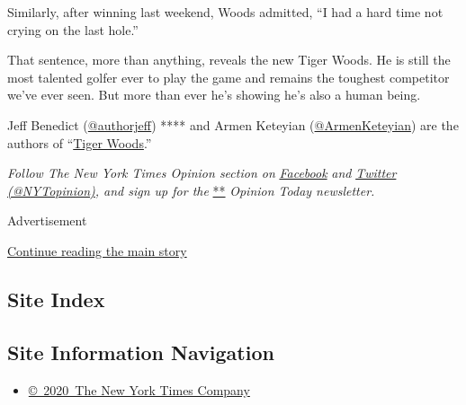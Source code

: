 Similarly, after winning last weekend, Woods admitted, ``I had a hard
time not crying on the last hole.''

That sentence, more than anything, reveals the new Tiger Woods. He is
still the most talented golfer ever to play the game and remains the
toughest competitor we've ever seen. But more than ever he's showing
he's also a human being.

Jeff Benedict (\href{https://twitter.com/authorjeff}{@authorjeff}) ****
and Armen Keteyian
(\href{https://twitter.com/ArmenKeteyian}{@ArmenKeteyian}) are the
authors of
``\href{http://www.simonandschuster.com/books/Tiger-Woods/Jeff-Benedict/9781501126420}{Tiger
Woods}.''

\emph{Follow The New York Times Opinion section on}
\href{https://www.facebook.com/nytopinion}{\emph{Facebook}} \emph{and}
\href{http://twitter.com/NYTOpinion}{\emph{Twitter
(@NYTopinion)}}\emph{, and sign up for the}
\href{http://www.nytimes.com/newsletters/opiniontoday/}{**}
\emph{Opinion Today newsletter.}

Advertisement

\protect\hyperlink{after-bottom}{Continue reading the main story}

\hypertarget{site-index}{%
\subsection{Site Index}\label{site-index}}

\hypertarget{site-information-navigation}{%
\subsection{Site Information
Navigation}\label{site-information-navigation}}

\begin{itemize}
\tightlist
\item
  \href{https://help.nytimes.com/hc/en-us/articles/115014792127-Copyright-notice}{©~2020~The
  New York Times Company}
\end{itemize}

